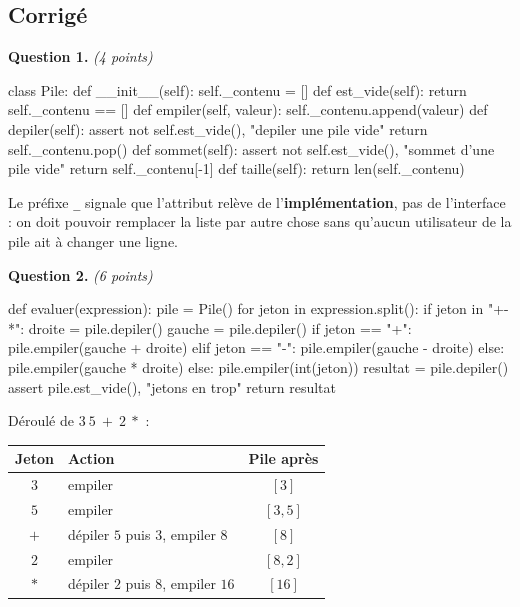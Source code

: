 \subsection*{Corrigé}

\textbf{Question 1.} \emph{(4 points)}

\begin{python}
class Pile:
    def __init__(self):
        self._contenu = []
    def est_vide(self):
        return self._contenu == []
    def empiler(self, valeur):
        self._contenu.append(valeur)
    def depiler(self):
        assert not self.est_vide(), "depiler une pile vide"
        return self._contenu.pop()
    def sommet(self):
        assert not self.est_vide(), "sommet d'une pile vide"
        return self._contenu[-1]
    def taille(self):
        return len(self._contenu)
\end{python}

Le préfixe \lstinline{_} signale que l'attribut relève de
l'\textbf{implémentation}, pas de l'interface : on doit pouvoir remplacer la
liste par autre chose sans qu'aucun utilisateur de la pile ait à changer une
ligne.

\medskip
\textbf{Question 2.} \emph{(6 points)}

\begin{python}
def evaluer(expression):
    pile = Pile()
    for jeton in expression.split():
        if jeton in "+-*":
            droite = pile.depiler()
            gauche = pile.depiler()
            if jeton == "+":
                pile.empiler(gauche + droite)
            elif jeton == "-":
                pile.empiler(gauche - droite)
            else:
                pile.empiler(gauche * droite)
        else:
            pile.empiler(int(jeton))
    resultat = pile.depiler()
    assert pile.est_vide(), "jetons en trop"
    return resultat
\end{python}

Déroulé de $3\ 5\ +\ 2\ *$ :

\begin{center}
\begin{tabular}{|c|l|c|}
\hline
\textbf{Jeton} & \textbf{Action} & \textbf{Pile après} \\
\hline
$3$ & empiler & $[3]$ \\
\hline
$5$ & empiler & $[3, 5]$ \\
\hline
$+$ & dépiler $5$ puis $3$, empiler $8$ & $[8]$ \\
\hline
$2$ & empiler & $[8, 2]$ \\
\hline
$*$ & dépiler $2$ puis $8$, empiler $16$ & $[16]$ \\
\hline
\end{tabular}
\end{center}

